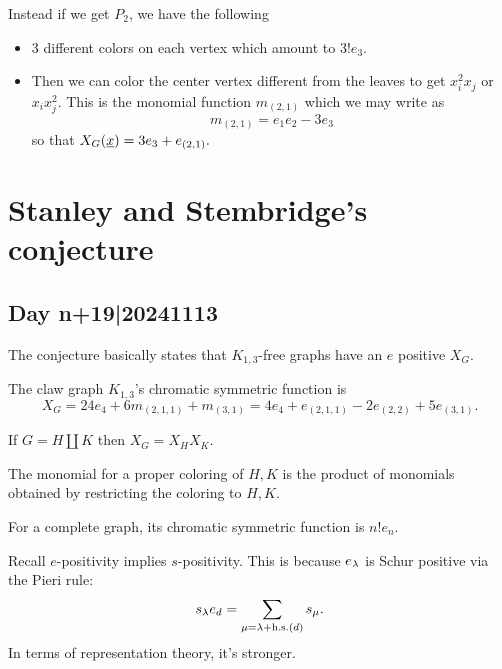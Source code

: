 \documentclass[12pt]{memoir}
\begin{document}
\begin{Ex}
    Instead if we get $P_2$, we have the following
    \begin{itemize}
        \item 3 different colors on each vertex which amount to $3! e_3$.
        \item Then we can color the center vertex different from the leaves to get $x_i^2x_j$ or $x_ix_j^2$. This is the monomial function $m_{(2,1)}$ which we may write as
        $$m_{(2,1)}=e_{1}e_2-3e_3$$
        so that $X_G(\underline x)=3e_3+e_{(2,1)}.$
    \end{itemize}
\end{Ex}

\chapter{Stanley and Stembridge's conjecture}

\section{Day n+19|20241113}

The conjecture basically states that $K_{1,3}$-free graphs have an $e$ positive $X_G$.

\begin{Ex}
    The claw graph $K_{1,3}$'s chromatic symmetric function is 
    $$X_G=24e_4+6m_{(2,1,1)}+m_{(3,1)}=4e_4+e_{(2,1,1)}-2e_{(2,2)}+5e_{(3,1)}.$$
\end{Ex}

\begin{Lem}
    If $G=H\coprod K$ then $X_G=X_HX_K$.
\end{Lem}

\begin{ptcbp}
    The monomial for a proper coloring of $H,K$ is the product of monomials obtained by restricting the coloring to $H,K$.
\end{ptcbp}

\begin{Ex}
    For a complete graph, its chromatic symmetric function is $n!e_n$.
\end{Ex}

\begin{Rmk}
    Recall $e$-positivity implies $s$-positivity. This is because $e_\lambda$ is Schur positive via the Pieri rule:
    $$s_\lambda e_d=\sum_{\mu=\lambda+\text{h.s.}(d)}s_\mu.$$
    In terms of representation theory, it's stronger.
\end{Rmk}
\end{document}
